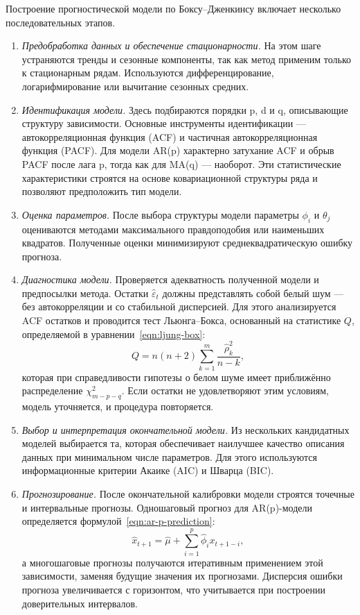 Построение прогностической модели по Боксу–Дженкинсу включает несколько последовательных этапов.
\begin{enumerate}
	\item \textit{Предобработка данных и обеспечение стационарности.} На этом шаге устраняются тренды и сезонные компоненты, так как метод применим только к стационарным рядам. Используются дифференцирование, логарифмирование или вычитание сезонных средних.
	\item \textit{Идентификация модели.} Здесь подбираются порядки p, d и q, описывающие структуру зависимости. Основные инструменты идентификации — автокорреляционная функция (ACF) и частичная автокорреляционная функция (PACF). Для модели AR(p) характерно затухание ACF и обрыв PACF после лага p, тогда как для MA(q) — наоборот. Эти статистические характеристики строятся на основе ковариационной структуры ряда и позволяют предположить тип модели.
	\item \textit{Оценка параметров.} После выбора структуры модели параметры $\phi_i$ и $\theta_j$ оцениваются методами максимального правдоподобия или наименьших квадратов. Полученные оценки минимизируют среднеквадратическую ошибку прогноза.
	\item \textit{Диагностика модели.} Проверяется адекватность полученной модели и предпосылки метода. Остатки $\hat\varepsilon_t$ должны представлять собой белый шум — без автокорреляции и со стабильной дисперсией. Для этого анализируется ACF остатков и проводится тест Льюнга–Бокса, основанный на статистике $Q$, определяемой в уравнении~\eqref{eqn:ljung-box}:
	\begin{equation}
	Q = n(n+2)\sum_{k=1}^m \frac{\hat\rho_k^2}{n-k},
	\label{eqn:ljung-box}
	\end{equation}
	которая при справедливости гипотезы о белом шуме имеет приближённо распределение $\chi^2_{m-p-q}$. Если остатки не удовлетворяют этим условиям, модель уточняется, и процедура повторяется.
	\item \textit{Выбор и интерпретация окончательной модели.} Из нескольких кандидатных моделей выбирается та, которая обеспечивает наилучшее качество описания данных при минимальном числе параметров. Для этого используются информационные критерии Акаике (AIC) и Шварца (BIC).
	\item \textit{Прогнозирование.} После окончательной калибровки модели строятся точечные и интервальные прогнозы. Одношаговый прогноз для AR(p)-модели определяется формулой~\eqref{eqn:ar-p-prediction}:
	\begin{equation}
	\hat{x}_{t+1} = \hat{\mu} + \sum_{i=1}^p \hat{\phi}_i x_{t+1-i},
	\label{eqn:ar-p-prediction}
	\end{equation}
	а многошаговые прогнозы получаются итеративным применением этой зависимости, заменяя будущие значения их прогнозами. Дисперсия ошибки прогноза увеличивается с горизонтом, что учитывается при построении доверительных интервалов.
\end{enumerate}

